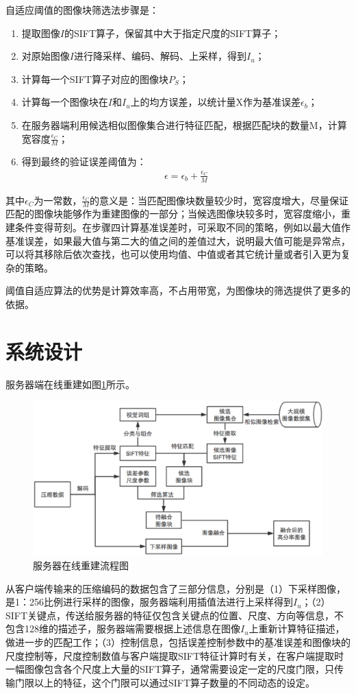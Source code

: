 \documentclass[UTF8]{csoarticle}
\begin{document}
自适应阈值的图像块筛选法步骤是：
\begin{enumerate}
\item 提取图像\(I\)的SIFT算子，保留其中大于指定尺度的SIFT算子；
\item 对原始图像\(I\)进行降采样、编码、解码、上采样，得到\(I_u\)；
\item 计算每一个SIFT算子对应的图像块\(P_S\)；
\item 计算每一个图像块在\(I\)和\(I_u\)上的均方误差，以统计量X作为基准误差\(\epsilon_b\)；
\item 在服务器端利用候选相似图像集合进行特征匹配，根据匹配块的数量M，计算宽容度\(\frac{\epsilon_C}{M}\)；
\item 得到最终的验证误差阈值为：
\begin{align}
\epsilon = \epsilon_b + \frac{\epsilon_C}{M}
\end{align}
\end{enumerate}

其中\(\epsilon_C\)为一常数，\(\frac{\epsilon_C}{M}\)的意义是：当匹配图像块数量较少时，宽容度增大，尽量保证匹配的图像块能够作为重建图像的一部分；当候选图像块较多时，宽容度缩小，重建条件变得苛刻。在步骤四计算基准误差时，可采取不同的策略，例如以最大值作基准误差，如果最大值与第二大的值之间的差值过大，说明最大值可能是异常点，可以将其移除后依次查找，也可以使用均值、中值或者其它统计量或者引入更为复杂的策略。

阈值自适应算法的优势是计算效率高，不占用带宽，为图像块的筛选提供了更多的依据。

\section{系统设计}

服务器端在线重建如图\ref{fig:serverOnline}所示。
\begin{figure}
\centering\includegraphics[width=15cm]{serverOnline}
\caption{服务器在线重建流程图}
\label{fig:serverOnline}
\end{figure}
从客户端传输来的压缩编码的数据包含了三部分信息，分别是（1）下采样图像，是1：256比例进行采样的图像，服务器端利用插值法进行上采样得到\(I_u\)；（2）SIFT关键点，传送给服务器的特征仅包含关键点的位置、尺度、方向等信息，不包含128维的描述子，服务器端需要根据上述信息在图像\(I_u\)上重新计算特征描述，做进一步的匹配工作；（3）控制信息，包括误差控制参数中的基准误差和图像块的尺度控制等，尺度控制数值与客户端提取SIFT特征计算时有关，在客户端提取时一幅图像包含各个尺度上大量的SIFT算子，通常需要设定一定的尺度门限，只传输门限以上的特征，这个门限可以通过SIFT算子数量的不同动态的设定。
\end{document}
